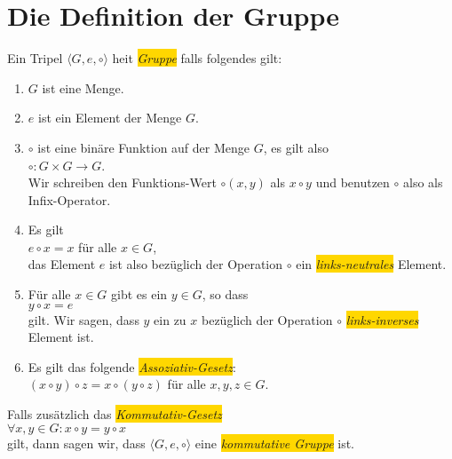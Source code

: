 \section{Die Definition der Gruppe}
\begin{Definition}[Gruppe]
Ein Tripel $\langle G, e, \circ \rangle$ hei\3t \colorbox{gold}{\emph{Gruppe}} falls folgendes gilt:
\begin{enumerate}
\item $G$ ist eine Menge.
\item $e$ ist ein Element der Menge $G$.
\item $\circ$ ist eine bin\"{a}re Funktion auf der Menge $G$, es gilt also
      \\[0.2cm]
      \hspace*{1.3cm}
      $\circ : G \times G \rightarrow G$.
      \\[0.2cm]
      Wir schreiben den Funktions-Wert $\circ(x,y)$ als $x \circ y$ und benutzen
      $\circ$ also als Infix-Operator.
\item Es gilt
      \\
      \hspace*{1.3cm}
      $e \circ x = x$ \quad f\"{u}r alle $x \in G$,
      \\[0.2cm]
      das Element $e$ ist also bez\"{u}glich der Operation $\circ$ ein \colorbox{gold}{\emph{links-neutrales}}
      Element.
\item F\"{u}r alle $x \in G$ gibt es ein $y \in G$, so dass
      \\[0.2cm]
      \hspace*{1.3cm}
      $y \circ x = e$
      \\[0.2cm]
      gilt.  Wir sagen, dass $y$ ein zu $x$ bez\"{u}glich der Operation $\circ$
      \colorbox{gold}{\emph{links-inverses}} Element ist.
\item Es gilt das folgende \colorbox{gold}{\emph{Assoziativ-Gesetz}}:
      \\[0.2cm]
      \hspace*{1.3cm}
      $(x \circ y) \circ z = x \circ (y \circ z)$ \quad f\"{u}r alle $x,y,z \in G$.
\end{enumerate}
Falls zus\"{a}tzlich das \colorbox{gold}{\emph{Kommutativ-Gesetz}}
\\[0.2cm]
\hspace*{1.3cm}
$\forall x, y \in G: x \circ y = y \circ x$
\\[0.2cm]
gilt, dann sagen wir, dass $\langle G, e, \circ \rangle$ eine \colorbox{gold}{\emph{kommutative Gruppe}} ist.
\end{Definition}

